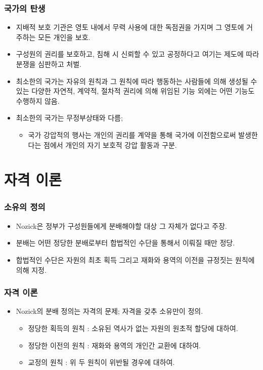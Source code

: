 \documentclass[aspectratio=169,xcolor=dvipsnames,handout]{beamer}
\begin{document}
\begin{frame}[<+->]
\frametitle{국가의 탄생}
    \begin{itemize}
        \item 지배적 보호 기관은 영토 내에서 무력 사용에 대한 독점권을 가지며 그 영토에 거주하는 모든 개인을 보호.
        \item 구성원의 권리를 보호하고, 침해 시 신뢰할 수 있고 공정하다고 여기는 제도에 따라 분쟁을 심판하고 처벌.
        \item 최소한의 국가는 자유의 원칙과 그 원칙에 따라 행동하는 사람들에 의해 생성될 수 있는 다양한 자연적, 계약적, 절차적 권리에 의해 위임된 기능 외에는 어떤 기능도 수행하지 않음.
        \item 최소한의 국가는 무정부상태와 다름;  
        \begin{itemize}
            \item 국가 강압적의 행사는 개인의 권리를 계약을 통해 국가에 이전함으로써 발생한다는 점에서 개인의 자기 보호적 강압 활동과 구분.
        \end{itemize}
    \end{itemize}
\end{frame}

\section{자격 이론}
\begin{frame}[<+->]
\frametitle{소유의 정의}
    \begin{itemize}
        \item Nozick은 정부가 구성원들에게 분배해야할 대상 그 자체가 없다고 주장.
        \item 분배는 어떤 정당한 분배로부터 합법적인 수단을 통해서 이뤄질 때만 정당.
        \item 합법적인 수단은 자원의 최초 획득 그리고 재화와 용역의 이전을 규정짓는 원칙에 의해 지정.
    \end{itemize}
\end{frame}


\begin{frame}[<+->]
\frametitle{자격 이론}
    \begin{itemize}
        \item Nozick의 분배 정의는 자격의 문제; 자격을 갖추 소유만이 정의.
        \begin{itemize}
            \item 정당한 획득의 원칙 : 소유된 역사가 없는 자원의 원초적 할당에 대하여.
            \item 정당한 이전의 원칙 : 재화와 용역의 개인간 교환에 대하여.
            \item 교정의 원칙 : 위 두 원칙이 위반될 경우에 대하여.
        \end{itemize}
    \end{itemize}
\end{frame}
  
\end{document}
